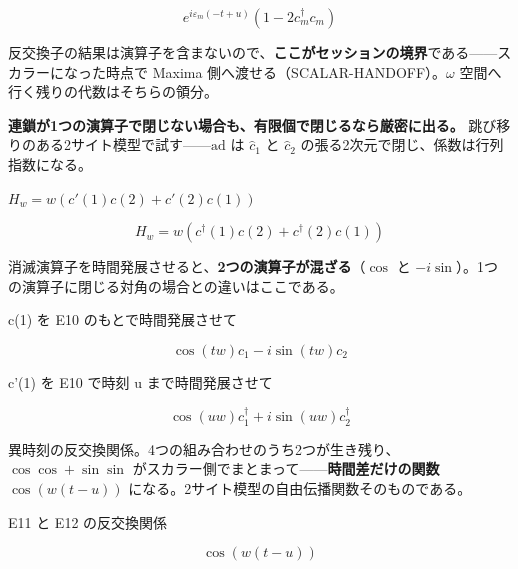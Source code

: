 \documentclass[dvipdfmx,a4paper,11pt]{jsarticle}
\begin{document}
\begin{equation}
  e^{i \varepsilon_{m} \left(- t + u\right)} \left(1 - 2 {c}_{m}^{\dagger} {c}_{m}\right)
  \label{eq:E9}
\end{equation}

反交換子の結果は演算子を含まないので、\textbf{ここがセッションの境界}である——スカラーになった時点で Maxima 側へ渡せる（SCALAR-HANDOFF）。$\omega$ 空間へ行く残りの代数はそちらの領分。

\textbf{連鎖が1つの演算子で閉じない場合も、有限個で閉じるなら厳密に出る。} 跳び移りのある2サイト模型で試す——$\mathrm{ad}$ は $\hat c_1$ と $\hat c_2$ の張る2次元で閉じ、係数は行列指数になる。

$H_w = w (c'(1) c(2) + c'(2) c(1))$

\begin{equation}
  H_w = w (c^{\dagger}(1) c(2) + c^{\dagger}(2) c(1))
  \label{eq:E10}
\end{equation}

消滅演算子を時間発展させると、\textbf{2つの演算子が混ざる}（$\cos$ と $-i\sin$）。1つの演算子に閉じる対角の場合との違いはここである。

c(1) を E10 のもとで時間発展させて

\begin{equation}
  \cos{\left(t w \right)} c_{1} -  i \sin{\left(t w \right)} c_{2}
  \label{eq:E11}
\end{equation}

c'(1) を E10 で時刻 u まで時間発展させて

\begin{equation}
  \cos{\left(u w \right)} c^{\dagger}_{1} + i \sin{\left(u w \right)} c^{\dagger}_{2}
  \label{eq:E12}
\end{equation}

異時刻の反交換関係。4つの組み合わせのうち2つが生き残り、$\cos\cos+\sin\sin$ がスカラー側でまとまって——\textbf{時間差だけの関数} $\cos(w(t-u))$ になる。2サイト模型の自由伝播関数そのものである。

E11 と E12 の反交換関係

\begin{equation}
  \cos{\left(w \left(t - u\right) \right)}
  \label{eq:E13}
\end{equation}
\end{document}
